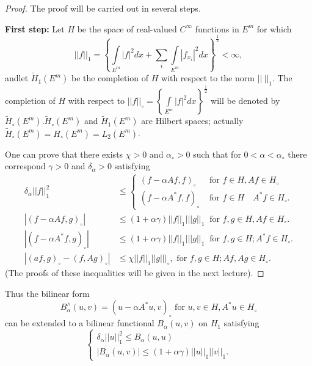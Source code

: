 \begin{proof}
The proof will be carried out in several steps.

 \noindent
 {\bf First step:} Let $H$ be the space of real-valued $C^\infty$
 functions in $E^m$ for which 
 $$
 || f ||_1 = \left\{\int \limits_{E^m} | f |^2 dx + \sum_i \int
 \limits_{E^m} | f_{x_i}|^2 dx \right\}^{\frac{1}{2}} < \infty, 
 $$
 and\pageoriginale let $\tilde{H}_1 (E^m)$ be the completion of $H$ with respect to
 the norm $|| ~||_1$. The completion of $H$ with respect to $|| f
 ||_\circ = \left\{ \int \limits_{E^m} | f |^2 dx \right
 \}^{\frac{1}{2}}$ will be denoted by $\tilde{H}_\circ
 (E^m). \tilde{H}_\circ (E^m)$ and $\tilde{H}_1(E^m)$ are Hilbert
 spaces; actually $\tilde{H}_\circ (E^m)= H_\circ (E^m) = L_2
 (E^m)$. 
 
 One can prove that there exists $\chi > 0$ and $\alpha_\circ > 0$
 such that for $0 < \alpha < \alpha_\circ$ there correspond $\gamma >
 0$ and $\delta_\alpha > 0$ satisfying 
\begin{align*}
 \delta_\alpha || f ||^2_1 & \leq 
 \begin{cases}
  (f -\alpha Af, f)_\circ & \text{ for } f \in H, A f \in H_\circ\\
  (f -\alpha A^*f, f)_\circ &\text{ for } f \in H \quad A^* f \in H_\circ.
 \end{cases}\\ 
  | (f -\alpha Af, g)_\circ | & \leq (1 + \alpha \gamma) || f ||_1 ||
  | g ||_1 ~ \text{ for } f, g \in H, A f \in H_\circ.\\ 
  | (f -\alpha A^*f, g)_\circ | & \leq (1 + \alpha \gamma ) || f ||_1
  | || g ||_1 ~ \text{ for } f, g \in H; A^* f \in H_\circ.\\ 
  | (af, g)_\circ - (f, Ag)_\circ | & \leq \chi || f ||_1 || g
  | ||_\circ, \text{ for } f, g \in H; Af, Ag \in H_\circ. 
\end{align*}
 (The proofs of these inequalities will be given in the next lecture).
\end{proof}
 Thus the bilinear form
 $$
 B^\wedge_\alpha(u,v) = (u - \alpha A^* u, v)_\circ \text{ for } u, v
 \in H, A^* u \in H_\circ 
 $$
 can be extended to a bilinear functional $B_\alpha (u, v)$ on $H_1$
 satisfying 
 \begin{equation*}
  \begin{cases}
   \delta_\alpha || u ||^2_1 \leq B_\alpha (u, u) \\
   | B_\alpha (u, v) | \leq (1+ \alpha \gamma ) || u ||_1 || v ||_1.
  \end{cases}
 \end{equation*} 
 
